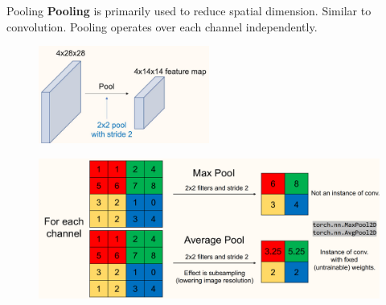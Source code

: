 \begin{frame}[allowframebreaks]

\begin{myconceptblock}{5.8}{Pooling}
    \textbf{Pooling} is primarily used to reduce spatial dimension.
    Similar to convolution.
    Pooling operates over each channel independently.

    \begin{figure}[H]
        \centering
        \includegraphics[width=0.5\textwidth]{.././assets/5.6.jpg}
    \end{figure}

    \begin{figure}[H]
        \centering
        \includegraphics[width=1.0\textwidth]{.././assets/5.7.png}
    \end{figure}
\end{myconceptblock}

\end{frame}

